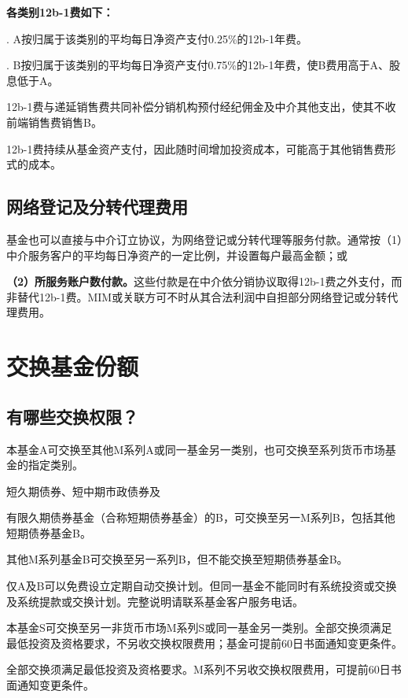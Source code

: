 \documentclass[UTF8,fontset=none,11pt,a4paper]{ctexart}
\begin{document}
\textbf{各类别12b-1费如下：}

. A按归属于该类别的平均每日净资产支付0.25\%的12b-1年费。


. B按归属于该类别的平均每日净资产支付0.75\%的12b-1年费，使B费用高于A、股息低于A。


12b-1费与递延销售费共同补偿分销机构预付经纪佣金及中介其他支出，使其不收前端销售费销售B。

12b-1费持续从基金资产支付，因此随时间增加投资成本，可能高于其他销售费形\allowbreak\mbox{式的成本。}

\subsection*{网络登记及分转代理费用}\label{unitU658}
基金也可以直接与中介订立协议，为网络登记或分转代理等服务付款。通常按（1）中介服务客户的平均每日净资产的一定比例，并设置每户最高金额；或

\textbf{（2）所服务账户数付款。}这些付款是在中介依分销协议取得12b-1费之外支付，而非替代12b-1费。MIM或关联方可不时从其合法利润中自担部分网络登记或分转\allowbreak\mbox{代理费用。}

\section*{交换基金份额}\label{unitU661}
\subsection*{有哪些交换权限？}
本基金A可交换至其他M系列A或同一基金另一类别，也可交换至系列货币市场基金的\allowbreak\mbox{指定类别。}

短久期债券、短中期市\allowbreak\mbox{政债券及}

有限久期债券基金（合称短期债券基金）的B，可交换至另一M系列B，包括其他短期债券基金B。

其他M系列基金B可交换至另一系列B，但不能交换至短期债券基金B。

仅A及B可以免费设立定期自动交换计划。但同一基金不能同时有系统投资或交换及系统提款或交换计划。完整说明请联系基金客户服\allowbreak\mbox{务电话。}

本基金S可交换至另一非货币市场M系列S或同一基金另一类别。全部交换须满足最低投资及资格要求，不另收交换权限费用；基金可提前60日书面通知\allowbreak\mbox{变更条件。}

全部交换须满足最低投资及资格要求。M系列不另收交换权限费用，可提前60日书面通知\allowbreak\mbox{变更条件。}
\end{document}
